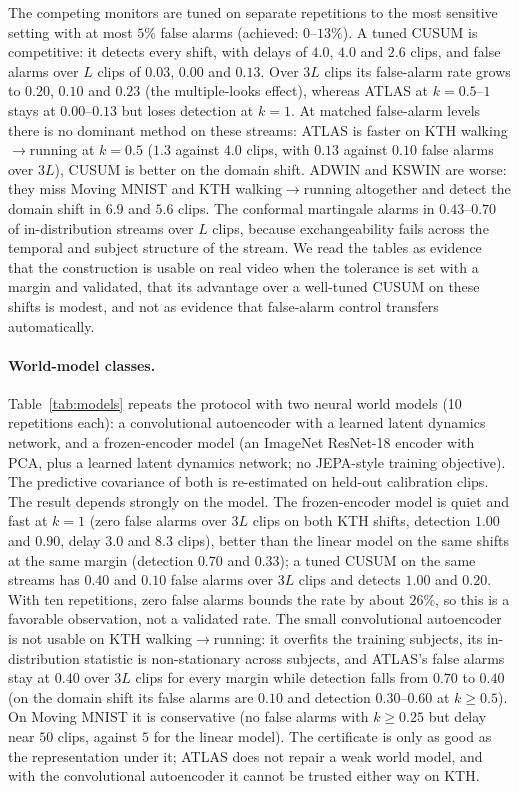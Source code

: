 The competing monitors are tuned on separate repetitions to the most sensitive setting with at most $5\%$ false alarms (achieved: $0$--$13\%$). A tuned CUSUM is competitive: it detects every shift, with delays of $4.0$, $4.0$ and $2.6$ clips, and false alarms over $L$ clips of $0.03$, $0.00$ and $0.13$. Over $3L$ clips its false-alarm rate grows to $0.20$, $0.10$ and $0.23$ (the multiple-looks effect), whereas ATLAS at $k=0.5$--$1$ stays at $0.00$--$0.13$ but loses detection at $k=1$. At matched false-alarm levels there is no dominant method on these streams: ATLAS is faster on KTH walking$\to$running at $k=0.5$ ($1.3$ against $4.0$ clips, with $0.13$ against $0.10$ false alarms over $3L$), CUSUM is better on the domain shift. ADWIN and KSWIN are worse: they miss Moving MNIST and KTH walking$\to$running altogether and detect the domain shift in $6.9$ and $5.6$ clips. The conformal martingale alarms in $0.43$--$0.70$ of in-distribution streams over $L$ clips, because exchangeability fails across the temporal and subject structure of the stream. We read the tables as evidence that the construction is usable on real video when the tolerance is set with a margin and validated, that its advantage over a well-tuned CUSUM on these shifts is modest, and not as evidence that false-alarm control transfers automatically.

\paragraph{World-model classes.} Table~\ref{tab:models} repeats the protocol with two neural world models (10 repetitions each): a convolutional autoencoder with a learned latent dynamics network, and a frozen-encoder model (an ImageNet ResNet-18 encoder with PCA, plus a learned latent dynamics network; no JEPA-style training objective). The predictive covariance of both is re-estimated on held-out calibration clips. The result depends strongly on the model. The frozen-encoder model is quiet and fast at $k=1$ (zero false alarms over $3L$ clips on both KTH shifts, detection $1.00$ and $0.90$, delay $3.0$ and $8.3$ clips), better than the linear model on the same shifts at the same margin (detection $0.70$ and $0.33$); a tuned CUSUM on the same streams has $0.40$ and $0.10$ false alarms over $3L$ clips and detects $1.00$ and $0.20$. With ten repetitions, zero false alarms bounds the rate by about $26\%$, so this is a favorable observation, not a validated rate. The small convolutional autoencoder is not usable on KTH walking$\to$running: it overfits the training subjects, its in-distribution statistic is non-stationary across subjects, and ATLAS's false alarms stay at $0.40$ over $3L$ clips for every margin while detection falls from $0.70$ to $0.40$ (on the domain shift its false alarms are $0.10$ and detection $0.30$--$0.60$ at $k\ge0.5$). On Moving MNIST it is conservative (no false alarms with $k\ge0.25$ but delay near $50$ clips, against $5$ for the linear model). The certificate is only as good as the representation under it; ATLAS does not repair a weak world model, and with the convolutional autoencoder it cannot be trusted either way on KTH.

